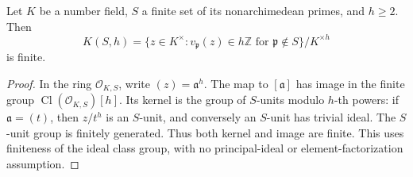 \begin{lemma}\label{pl-selmer-finite}
Let $K$ be a number field, $S$ a finite set of its nonarchimedean primes,
and $h\ge2$. Then
\[
 K(S,h)=
 \{z\in K^\times:v_{\mathfrak p}(z)\in h\mathbb Z
       \text{ for }\mathfrak p\notin S\}/K^{\times h}
\]
is finite.
\end{lemma}
\begin{proof}
In the ring $\mathcal O_{K,S}$, write $(z)=\mathfrak a^h$. The map
to $[\mathfrak a]$ has image in the finite group
$\operatorname{Cl}(\mathcal O_{K,S})[h]$. Its kernel is the group of
$S$-units modulo $h$-th powers: if $\mathfrak a=(t)$, then $z/t^h$
is an $S$-unit, and conversely an $S$-unit has trivial ideal. The
$S$-unit group is finitely generated. Thus both kernel and image are
finite. This uses finiteness of the ideal class group, with no
principal-ideal or element-factorization assumption.
\end{proof}


